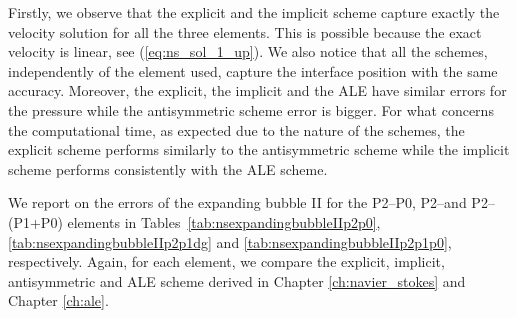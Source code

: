 Firstly, we observe that the explicit and the implicit scheme capture exactly
the velocity solution for all the three elements. This is possible because the
exact velocity is linear, see (\ref{eq:ns_sol_1_up}). We  also notice that
all the schemes, independently of the element used, capture the interface
position with the same accuracy. Moreover, the explicit, the implicit and the
ALE have similar errors for the pressure while the antisymmetric scheme error
is bigger. For what concerns the computational time, as expected due to the
nature  of the schemes, the explicit scheme performs similarly to the
antisymmetric scheme while the implicit scheme performs consistently with the
ALE scheme.

We report on the errors of the expanding bubble II for the P2--P0, P2--\pdg and
P2--(P1+P0) elements in Tables~\ref{tab:nsexpandingbubbleIIp2p0},
\ref{tab:nsexpandingbubbleIIp2p1dg} and \ref{tab:nsexpandingbubbleIIp2p1p0},
respectively. Again, for each element, we compare the explicit, implicit,
antisymmetric and ALE scheme derived in Chapter \ref{ch:navier_stokes} and
Chapter \ref{ch:ale}.
